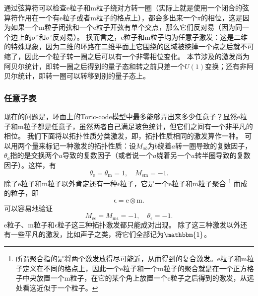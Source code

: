 通过弦算符可以检查e粒子和m粒子绕对方转一圈（实际上就是使用一个闭合的弦算符作用在一个有e粒子或者m粒子的格点上），都会多出来一个$\pi$的相位，这是因为如果一个m粒子闭弦和一个e粒子开弦有单个交点，那么它们反对易（因为同一个边上的${\sigma}^x$和${\sigma}^z$反对易）。
换而言之，e粒子和m粒子均为任意子激发：这是二维的特殊现象，因为二维的环路在二维平面上它围绕的区域被挖掉一个点之后就不可缩了，因此一个粒子转一圈之后可以有一个非零相位变化。
本节涉及的激发尚为阿贝尔统计，即转一圈之后得到的量子态和转之前只差一个$U(1)$变换；还有非阿贝尔统计，即转一圈可以转移到别的量子态上。

\subsubsection{任意子表}

现在的问题是，环面上的Toric-code模型中最多能够弄出来多少任意子？显然e粒子和m粒子都是任意子，虽然两者自己满足玻色统计，但它们之间有一个非平凡的相位。
我们下面将以拓扑性质分类激发，即，拓扑性质相同的激发算作一种。
可以用两个量来标记一种激发的拓扑性质：设$M_{ab}$为$b$绕着$a$转一圈导致的复数因子，$\theta_a$指的是交换两个$a$导致的复数因子（或者说一个$a$绕着另一个$a$转半圈导致的复数因子）。这样，有
\begin{equation}
    \theta_\mathrm{e} = \theta_\mathrm{m} = 1, \quad M_\mathrm{em} = - 1.
\end{equation}
除了e粒子和m粒子以外肯定还有一种$\mathrm{\epsilon}$粒子，它是一个e粒子和m粒子聚合%
\footnote{所谓聚合指的是将两个激发放得尽可能近，从而得到的复合激发。e粒子和m粒子定义在不同的格点上，因此一个e粒子和一个m粒子的聚合就是在一个正方格子中央放置一个m粒子，在它的某个角上放置一个e粒子之后得到的激发，从远处看这近似于一个粒子。}%
而成的粒子，即
\begin{equation}
    \mathrm{\epsilon} = \mathrm{e} \otimes \mathrm{m}.
\end{equation}
可以容易地验证
\begin{equation}
    M_\mathrm{e\epsilon} = M_\mathrm{m\epsilon} = -1, \quad \theta_\mathrm{\epsilon} = -1.
\end{equation}
e粒子、m粒子和$\mathrm{\epsilon}$粒子这三种拓扑激发都只能成对出现。
除了这三种激发以外还有一些平凡的激发，比如声子之类，将它们全部记为$\mathbbm{1}$。

